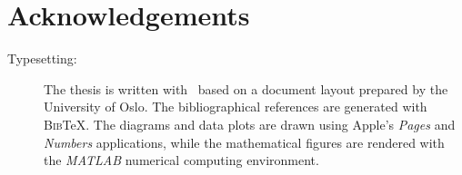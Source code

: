 \chapter*{Acknowledgements}






\null
\vfill
\begin{description}
\item [Typesetting: ] The thesis is written with \LaTeXe \ based on a document layout prepared by the University of Oslo. The bibliographical references are generated with \textsc{Bib}\negthinspace\TeX. The diagrams and data plots are drawn using Apple's \textit{Pages} and \textit{Numbers} applications, while the mathematical figures are rendered with the \textit{MATLAB} numerical computing environment.
\end{description}